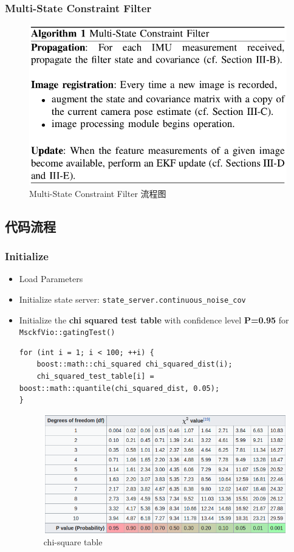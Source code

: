 \documentclass[12pt,a4paper]{article}
\begin{document}
\subsubsection{Multi-State Constraint Filter}

\begin{figure}[!htbp]
\centering
\includegraphics[scale=0.6]{images/msckf_algr.png}
\caption{Multi-State Constraint Filter 流程图}
\end{figure}

\subsection{代码流程}

\subsubsection{Initialize}

\begin{itemize}
\item Load Parameters
\item Initialize state server: \verb|state_server.continuous_noise_cov|
\item Initialize the \textbf{chi squared test table} with confidence level \textbf{P=0.95} for \verb|MsckfVio::gatingTest()|
\begin{lstlisting}
for (int i = 1; i < 100; ++i) {
    boost::math::chi_squared chi_squared_dist(i);
    chi_squared_test_table[i] = boost::math::quantile(chi_squared_dist, 0.05);
}
\end{lstlisting}
\begin{figure}[!htbp]
\centering
\includegraphics[scale=0.6]{images/chi_square_table.png}
\caption{chi-square table}
\end{figure}
\end{itemize}
\end{document}
